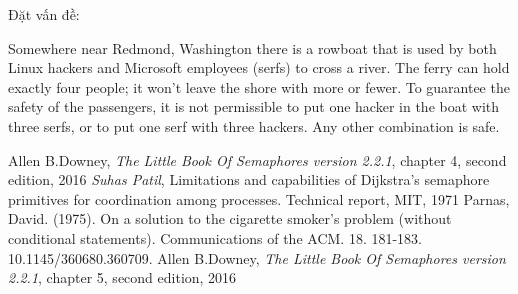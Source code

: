 \documentclass[a4paper]{article}
\begin{document}
	\large{Đặt vấn đề:}
	
	\begin{tcolorbox}
		Somewhere near Redmond, Washington there is a rowboat that is used by
both Linux hackers and Microsoft employees (serfs) to cross a river. The ferry
can hold exactly four people; it won’t leave the shore with more or fewer. To
guarantee the safety of the passengers, it is not permissible to put one hacker
in the boat with three serfs, or to put one serf with three hackers. Any other
combination is safe.
	\end{tcolorbox}
	
	\pagebreak
	\begin{thebibliography}{9}
  	Allen B.Downey,
  	\textit{The Little Book Of Semaphores version 2.2.1}, chapter 4, second edition, 2016
  	\textit{Suhas Patil},  Limitations and capabilities of Dijkstra’s semaphore primitives
	for coordination among processes. Technical report, MIT, 1971
	\textit{}Parnas, David. (1975). On a solution to the cigarette smoker's problem (without conditional statements). Communications of the ACM. 18. 181-183. 10.1145/360680.360709. 
  	Allen B.Downey,
  	\textit{The Little Book Of Semaphores version 2.2.1}, chapter 5, second edition, 2016
	\end{thebibliography}
\end{document}
